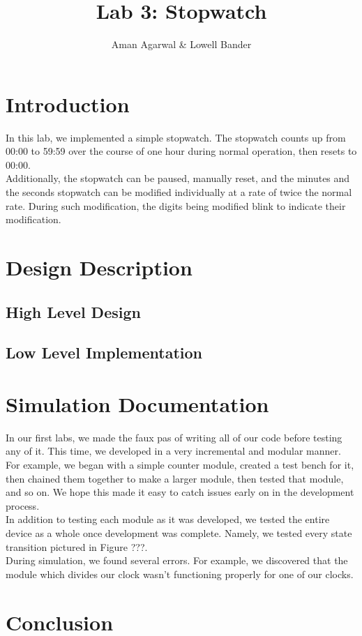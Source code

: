 \documentclass[]{article}
\newcommand{\subtitle}[1]{%
  \posttitle{%
    \par\end{center}
    \begin{center}\large#1\end{center}
    \vskip0.5em}%
}
\begin{document}
\title{Lab 3: Stopwatch}
\subtitle{CS M152A}
\author{Aman Agarwal \& Lowell Bander}

\maketitle
\tableofcontents \newpage

\section{Introduction}

In this lab, we implemented a simple stopwatch. The stopwatch counts up from 00:00 to 59:59 over the course of one hour during normal operation, then resets to 00:00. \\

Additionally, the stopwatch can be paused, manually reset, and the minutes and the seconds stopwatch can be modified individually at a rate of twice the normal rate. During such modification, the digits being modified blink to indicate their modification.

\section{Design Description}

\subsection{High Level Design}

\subsection{Low Level Implementation}

\section{Simulation Documentation}

In our first labs, we made the faux pas of writing all of our code before testing any of it. This time, we developed in a very incremental and modular manner. For example, we began with a simple counter module, created a test bench for it, then chained them together to make a larger module, then tested that module, and so on. We hope this made it easy to catch issues early on in the development process.\\

In addition to testing each module as it was developed, we tested the entire device as a whole once development was complete. Namely, we tested every state transition pictured in Figure ???.\\

During simulation, we found several errors. For example, we discovered that the module which divides our clock wasn't functioning properly for one of our clocks.

\section{Conclusion}
\end{document}
